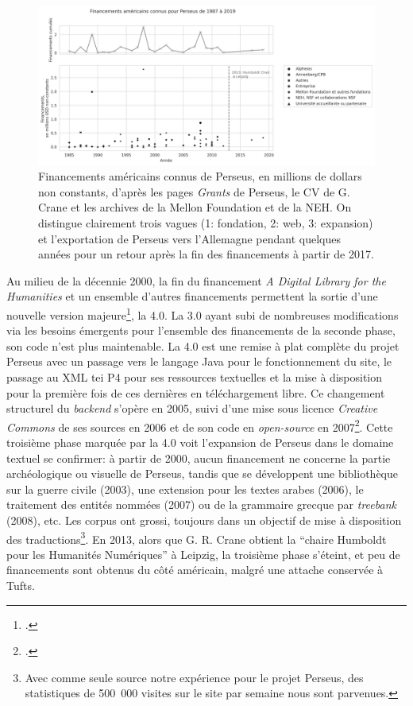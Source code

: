 \begin{figure}
    \centering
    \includegraphics[width=\linewidth]{figures/chap1/part1/PerseusFinancements.png}
    \caption{Financements américains connus de Perseus, en millions de dollars non constants, d'après les pages \textit{Grants} de Perseus, le CV de G. Crane et les archives de la Mellon Foundation et de la NEH. On distingue clairement trois vagues (1: fondation, 2: web, 3: expansion) et l'exportation de Perseus vers l'Allemagne pendant quelques années pour un retour après la fin des financements à partir de 2017.}
    \label{fig:chap1:perseus_fundings}
\end{figure}

Au milieu de la décennie 2000, la fin du financement \textit{A Digital Library for the Humanities} et un ensemble d'autres financements permettent la sortie d'une nouvelle version majeure\footcite{noauthor_gregory_nodate}, la 4.0. La 3.0 ayant subi de nombreuses modifications via les besoins émergents pour l'ensemble des financements de la seconde phase, son code n'est plus maintenable. La 4.0 est une remise à plat complète du projet Perseus avec un passage vers le langage Java pour le fonctionnement du site, le passage au XML \acrshort{tei} P4 pour ses ressources textuelles et la mise à disposition pour la première fois de ces dernières en téléchargement libre. Ce changement structurel du \textit{backend} s'opère en 2005, suivi d'une mise sous licence \textit{Creative Commons} de ses sources en 2006 et de son code en \textit{open-source} en 2007\footcite{rockwell_face_2013}. Cette troisième phase marquée par la 4.0 voit l'expansion de Perseus dans le domaine textuel se confirmer: à partir de 2000, aucun financement ne concerne la partie archéologique ou visuelle de Perseus, tandis que se développent une bibliothèque sur la guerre civile (2003), une extension pour les textes arabes (2006), le traitement des entités nommées (2007) ou de la grammaire grecque par \textit{treebank} (2008), etc. Les corpus ont grossi, toujours dans un objectif de mise à disposition des traductions\footnote{Avec comme seule source notre expérience pour le projet Perseus, des statistiques de 500~000 visites sur le site par semaine nous sont parvenues.}. En 2013, alors que G. R. Crane obtient la ``chaire Humboldt pour les Humanités Numériques'' à Leipzig, la troisième phase s'éteint, et peu de financements sont obtenus du côté américain, malgré une attache conservée à Tufts.

